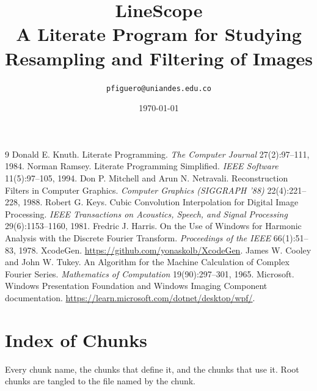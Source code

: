\documentclass[11pt,a4paper,openany]{book}
\title{\Huge LineScope\\[0.6em]\Large A Literate Program for Studying\\Resampling and Filtering of Images}
\author{\texttt{pfiguero@uniandes.edu.co}}
\date{\today}
\begin{document}
\frontmatter
\maketitle
\tableofcontents
\mainmatter

\backmatter
\cleardoublepage{}
{}
\begin{thebibliography}{9}
 Donald E. Knuth. Literate Programming. \emph{The Computer Journal} 27(2):97--111, 1984.
 Norman Ramsey. Literate Programming Simplified. \emph{IEEE Software} 11(5):97--105, 1994.
 Don P. Mitchell and Arun N. Netravali. Reconstruction Filters in Computer Graphics.
  \emph{Computer Graphics (SIGGRAPH '88)} 22(4):221--228, 1988.
 Robert G. Keys. Cubic Convolution Interpolation for Digital Image Processing.
  \emph{IEEE Transactions on Acoustics, Speech, and Signal Processing} 29(6):1153--1160, 1981.
 Fredric J. Harris. On the Use of Windows for Harmonic Analysis with the Discrete Fourier Transform.
  \emph{Proceedings of the IEEE} 66(1):51--83, 1978.
 XcodeGen. \url{https://github.com/yonaskolb/XcodeGen}.
 James W. Cooley and John W. Tukey. An Algorithm for the Machine Calculation of Complex
  Fourier Series. \emph{Mathematics of Computation} 19(90):297--301, 1965.
 Microsoft. Windows Presentation Foundation and Windows Imaging Component documentation.
  \url{https://learn.microsoft.com/dotnet/desktop/wpf/}.
\end{thebibliography}
\chapter*{Index of Chunks}
Every chunk name, the chunks that define it, and the chunks that use it.
Root chunks are tangled to the file named by the chunk.

\end{document}
